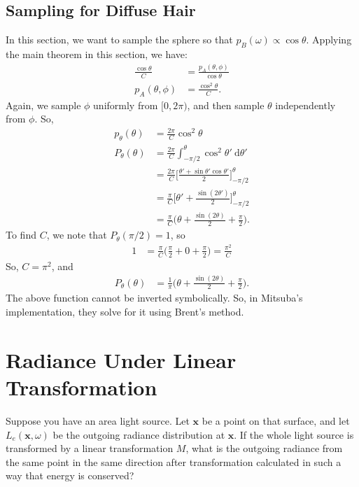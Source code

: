 \documentclass[10pt]{article}
\newcommand{\dee}{\mathrm{d}}
\newcommand{\ve}[1]{\mathbf{#1}}
\begin{document}
  \subsection{Sampling for Diffuse Hair}
  In this section, we want to sample the sphere so that $p_B(\omega) \propto \cos\theta$.  Applying the main theorem in this section, we have:
  \begin{align*}
    \frac{\cos\theta}{C} &= \frac{p_A(\theta,\phi)}{\cos\theta}\\
    p_A(\theta,\phi) &= \frac{\cos^2\theta}{C}.
  \end{align*}
  Again, we sample $\phi$ uniformly from $[0,2\pi)$, and then sample $\theta$ independently from $\phi$.  So,
  \begin{align*}
    p_\theta(\theta) 
    &= \frac{2\pi}{C} \cos^2\theta \\
    P_\theta(\theta) 
    &= \frac{2\pi}{C} \int_{-\pi/2}^{\theta} \cos^2 \theta'\ \dee\theta' \\
    &= \frac{2\pi}{C} \bigg[ \frac{\theta' + \sin \theta' \cos\theta'}{2} \bigg]_{-\pi/2}^\theta \\
    &= \frac{\pi}{C} \bigg[ \theta' + \frac{\sin(2\theta')}{2} \bigg]_{-\pi/2}^\theta \\
    &= \frac{\pi}{C} \bigg( \theta + \frac{\sin(2\theta)}{2} + \frac{\pi}{2} \bigg).
  \end{align*}
  To find $C$, we note that $P_\theta(\pi/2) = 1$, so
  \begin{align*}
    1 &= \frac{\pi}{C}\bigg( \frac{\pi}{2} + 0 + \frac{\pi}{2} \bigg) = \frac{\pi^2}{C}
  \end{align*}    
  So, $C = \pi^2$, and
  \begin{align*}
    P_\theta(\theta) &= \frac{1}{\pi} \bigg( \theta + \frac{\sin(2\theta)}{2} + \frac{\pi}{2} \bigg).
  \end{align*}
  The above function cannot be inverted symbolically.  So, in Mitsuba's implementation, they solve for it using Brent's method.

  \section{Radiance Under Linear Transformation}

  Suppose you have an area light source.  Let $\ve{x}$ be a point on that surface, and let $L_e(\ve{x},\omega)$ be the outgoing radiance distribution at $\ve{x}$.  If the whole light source is transformed by a linear transformation $M$, what is the outgoing radiance from the same point in the same direction after transformation calculated in such a way that energy is conserved?
\end{document}

